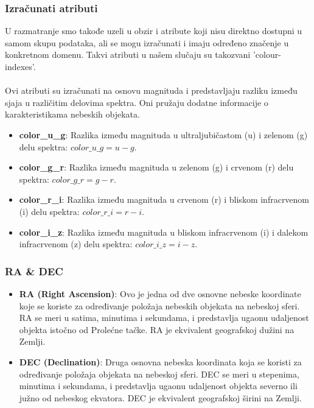 \documentclass[a4paper,12pt]{article}
\begin{document}
\subsubsection{Izračunati atributi}

U razmatranje smo takođe uzeli u obzir i atribute koji nisu direktno dostupni u samom skupu podataka, ali se mogu izračunati i imaju određeno značenje u konkretnom domenu. Takvi atributi u našem slučaju su takozvani 'colour-indexes'.
\\\\Ovi atributi su izračunati na osnovu magnituda i predstavljaju razliku između sjaja u različitim delovima spektra. Oni pružaju dodatne informacije o karakteristikama nebeskih objekata.
        \begin{itemize}
            \item \textbf{color\_u\_g}: Razlika između magnituda u ultraljubičastom (u) i zelenom (g) delu spektra: $color\_u\_g = u - g$.
            \item \textbf{color\_g\_r}: Razlika između magnituda u zelenom (g) i crvenom (r) delu spektra: $color\_g\_r = g - r$.
            \item \textbf{color\_r\_i}: Razlika između magnituda u crvenom (r) i bliskom infracrvenom (i) delu spektra: $color\_r\_i = r - i$.
            \item \textbf{color\_i\_z}: Razlika između magnituda u bliskom infracrvenom (i) i dalekom infracrvenom (z) delu spektra: $color\_i\_z = i - z$.
        \end{itemize}

\subsubsection{RA & DEC}

\begin{itemize}
    \item \textbf{RA (Right Ascension)}: Ovo je jedna od dve osnovne nebeske koordinate koje se koriste za određivanje položaja nebeskih objekata na nebeskoj sferi. RA se meri u satima, minutima i sekundama, i predstavlja ugaonu udaljenost objekta istočno od Prolećne tačke. RA je ekvivalent geografskoj dužini na Zemlji.
    
    \item \textbf{DEC (Declination)}: Druga osnovna nebeska koordinata koja se koristi za određivanje položaja objekata na nebeskoj sferi. DEC se meri u stepenima, minutima i sekundama, i predstavlja ugaonu udaljenost objekta severno ili južno od nebeskog ekvatora. DEC je ekvivalent geografskoj širini na Zemlji.
\end{itemize}
\end{document}
